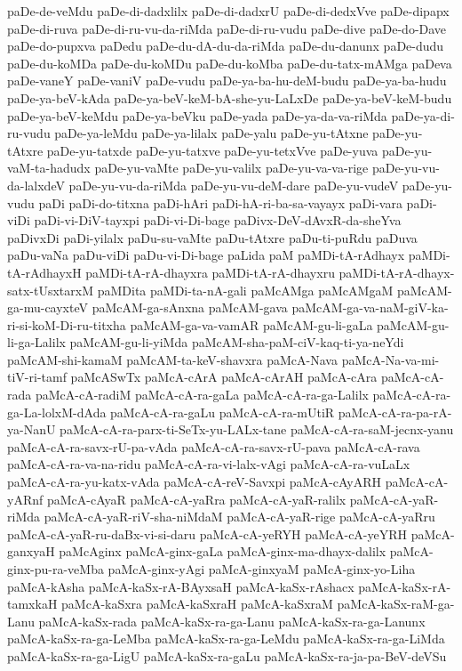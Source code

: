 {paDe-de-veMdu
paDe-di-dadxlilx
paDe-di-dadxrU
paDe-di-dedxVve
paDe-dipapx
paDe-di-ruva
paDe-di-ru-vu-da-riMda
paDe-di-ru-vudu
paDe-dive
paDe-do-Dave
paDe-do-pupxva
paDedu
paDe-du-dA-du-da-riMda
paDe-du-danunx
paDe-dudu
paDe-du-koMDa
paDe-du-koMDu
paDe-du-koMba
paDe-du-tatx-mAMga
paDeva
paDe-vaneY
paDe-vaniV
paDe-vudu
paDe-ya-ba-hu-deM-budu
paDe-ya-ba-hudu
paDe-ya-beV-kAda
paDe-ya-beV-keM-bA-she-yu-LaLxDe
paDe-ya-beV-keM-budu
paDe-ya-beV-keMdu
paDe-ya-beVku
paDe-yada
paDe-ya-da-va-riMda
paDe-ya-di-ru-vudu
paDe-ya-leMdu
paDe-ya-lilalx
paDe-yalu
paDe-yu-tAtxne
paDe-yu-tAtxre
paDe-yu-tatxde
paDe-yu-tatxve
paDe-yu-tetxVve
paDe-yuva
paDe-yu-vaM-ta-hadudx
paDe-yu-vaMte
paDe-yu-valilx
paDe-yu-va-va-rige
paDe-yu-vu-da-lalxdeV
paDe-yu-vu-da-riMda
paDe-yu-vu-deM-dare
paDe-yu-vudeV
paDe-yu-vudu
paDi
paDi-do-titxna
paDi-hAri
paDi-hA-ri-ba-sa-vayayx
paDi-vara
paDi-viDi
paDi-vi-DiV-tayxpi
paDi-vi-Di-bage
paDivx-DeV-dAvxR-da-sheYva
paDivxDi
paDi-yilalx
paDu-su-vaMte
paDu-tAtxre
paDu-ti-puRdu
paDuva
paDu-vaNa
paDu-viDi
paDu-vi-Di-bage
paLida
paM
paMDi-tA-rAdhayx
paMDi-tA-rAdhayxH
paMDi-tA-rA-dhayxra
paMDi-tA-rA-dhayxru
paMDi-tA-rA-dhayx-satx-tUsxtarxM
paMDita
paMDi-ta-nA-gali
paMcAMga
paMcAMgaM
paMcAM-ga-mu-cayxteV
paMcAM-ga-sAnxna
paMcAM-gava
paMcAM-ga-va-naM-giV-ka-ri-si-koM-Di-ru-titxha
paMcAM-ga-va-vamAR
paMcAM-gu-li-gaLa
paMcAM-gu-li-ga-Lalilx
paMcAM-gu-li-yiMda
paMcAM-sha-paM-ciV-kaq-ti-ya-neYdi
paMcAM-shi-kamaM
paMcAM-ta-keV-shavxra
paMcA-Nava
paMcA-Na-va-mi-tiV-ri-tamf
paMcASwTx
paMcA-cArA
paMcA-cArAH
paMcA-cAra
paMcA-cA-rada
paMcA-cA-radiM
paMcA-cA-ra-gaLa
paMcA-cA-ra-ga-Lalilx
paMcA-cA-ra-ga-La-lolxM-dAda
paMcA-cA-ra-gaLu
paMcA-cA-ra-mUtiR
paMcA-cA-ra-pa-rA-ya-NanU
paMcA-cA-ra-parx-ti-SeTx-yu-LALx-tane
paMcA-cA-ra-saM-jecnx-yanu
paMcA-cA-ra-savx-rU-pa-vAda
paMcA-cA-ra-savx-rU-pava
paMcA-cA-rava
paMcA-cA-ra-va-na-ridu
paMcA-cA-ra-vi-lalx-vAgi
paMcA-cA-ra-vuLaLx
paMcA-cA-ra-yu-katx-vAda
paMcA-cA-reV-Savxpi
paMcA-cAyARH
paMcA-cA-yARnf
paMcA-cAyaR
paMcA-cA-yaRra
paMcA-cA-yaR-ralilx
paMcA-cA-yaR-riMda
paMcA-cA-yaR-riV-sha-niMdaM
paMcA-cA-yaR-rige
paMcA-cA-yaRru
paMcA-cA-yaR-ru-daBx-vi-si-daru
paMcA-cA-yeRYH
paMcA-cA-yeYRH
paMcA-ganxyaH
paMcAginx
paMcA-ginx-gaLa
paMcA-ginx-ma-dhayx-dalilx
paMcA-ginx-pu-ra-veMba
paMcA-ginx-yAgi
paMcA-ginxyaM
paMcA-ginx-yo-Liha
paMcA-kAsha
paMcA-kaSx-rA-BAyxsaH
paMcA-kaSx-rAshacx
paMcA-kaSx-rA-tamxkaH
paMcA-kaSxra
paMcA-kaSxraH
paMcA-kaSxraM
paMcA-kaSx-raM-ga-Lanu
paMcA-kaSx-rada
paMcA-kaSx-ra-ga-Lanu
paMcA-kaSx-ra-ga-Lanunx
paMcA-kaSx-ra-ga-LeMba
paMcA-kaSx-ra-ga-LeMdu
paMcA-kaSx-ra-ga-LiMda
paMcA-kaSx-ra-ga-LigU
paMcA-kaSx-ra-gaLu
paMcA-kaSx-ra-ja-pa-BeV-deVSu
}
